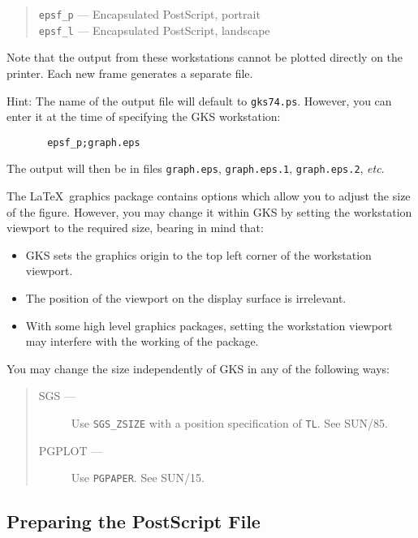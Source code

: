 \documentclass[11pt,twoside]{article}
\newcommand{\xref}[3]{#1}
\newcommand{\xlabel}[1]{}
\begin{document}
\begin{quote}
  \texttt{epsf\_p} --- Encapsulated PostScript, portrait\\
  \texttt{epsf\_l} --- Encapsulated PostScript, landscape
\end{quote}

Note that the output from these workstations cannot be plotted directly on
the printer. Each new frame generates a separate file.

Hint: The name of the output file will default to \texttt{gks74.ps}.
However, you can enter it at the time of specifying the GKS workstation:

\begin{verbatim}
       epsf_p;graph.eps
\end{verbatim}

The output will then be in files \texttt{graph.eps},
\texttt{graph.eps.1}, \texttt{graph.eps.2}, \emph{etc}.

The \LaTeX\ graphics package contains options which allow you to
adjust the size of the figure.
However, you may change it within GKS by setting the workstation viewport to
the required size, bearing in mind that:

\begin{itemize}
  \item GKS sets the graphics origin to the top left corner of the workstation
        viewport.
  \item The position of the viewport on the display surface is irrelevant.
  \item With some high level graphics packages, setting the workstation
        viewport may interfere with the working of the package.
\end{itemize}

You may change the size independently of GKS in any of the following ways:

\begin{quote}
  \begin{description}
    \item[SGS ---] Use \texttt{SGS\_ZSIZE} with a position specification of \texttt{TL}.
               See \xref{SUN/85}{sun85}{}\cite{sun85}.
    \item[PGPLOT ---] Use \texttt{PGPAPER}. See \xref{SUN/15}{sun15}{}\cite{sun15}.
  \end{description}
\end{quote}

\subsection{\xlabel{preparing_the_postscript_file}\label{preparing_the_postscript_file}Preparing the PostScript File}
\end{document}
